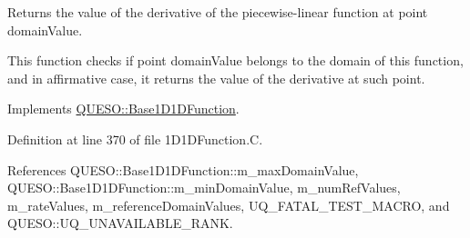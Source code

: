 Returns the value of the derivative of the piecewise-\/linear function at point {\ttfamily domain\-Value}. 

This function checks if point {\ttfamily domain\-Value} belongs to the domain of {\ttfamily this} function, and in affirmative case, it returns the value of the derivative at such point. 

Implements \hyperlink{class_q_u_e_s_o_1_1_base1_d1_d_function_a6b8de03f2099f31735dcaf15c24bca32}{Q\-U\-E\-S\-O\-::\-Base1\-D1\-D\-Function}.



Definition at line 370 of file 1\-D1\-D\-Function.\-C.



References Q\-U\-E\-S\-O\-::\-Base1\-D1\-D\-Function\-::m\-\_\-max\-Domain\-Value, Q\-U\-E\-S\-O\-::\-Base1\-D1\-D\-Function\-::m\-\_\-min\-Domain\-Value, m\-\_\-num\-Ref\-Values, m\-\_\-rate\-Values, m\-\_\-reference\-Domain\-Values, U\-Q\-\_\-\-F\-A\-T\-A\-L\-\_\-\-T\-E\-S\-T\-\_\-\-M\-A\-C\-R\-O, and Q\-U\-E\-S\-O\-::\-U\-Q\-\_\-\-U\-N\-A\-V\-A\-I\-L\-A\-B\-L\-E\-\_\-\-R\-A\-N\-K.


